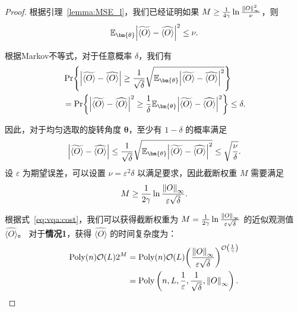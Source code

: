 \begin{proof}

  根据引理~\ref{lemma:MSE_l}，我们已经证明如果 $M\geq\frac{1}{4\gamma}\ln{\frac{\norm{O}_\infty^2}{\nu}}$，则
 \begin{equation}
  \mathbb{E}_{\bm{\theta}}\abs{\widetilde{\langle O\rangle}-\widehat{\langle O\rangle}}^2 \leq \nu.
 \end{equation}
  
 根据Markov不等式，对于任意概率 $\delta$，我们有
 \begin{equation}
    \begin{aligned}
        &\Pr{\abs{\widetilde{\langle O\rangle}-\widehat{\langle O\rangle}}\geq\frac{1}{\sqrt{\delta}}\sqrt{\mathbb{E}_{\bm{\theta}}\abs{\widetilde{\langle O\rangle}-\widehat{\langle O\rangle}}^2}}\\
        &=\Pr{\abs{\widetilde{\langle O\rangle}-\widehat{\langle O\rangle}}^2\geq\frac{1}{\delta}{\mathbb{E}_{\bm{\theta}}\abs{\widetilde{\langle O\rangle}-\widehat{\langle O\rangle}}^2}}\leq \delta.
    \end{aligned}
 \end{equation}

因此，对于均匀选取的旋转角度 $\bm{\theta}$，至少有 $1-\delta$ 的概率满足
\begin{equation}
  \abs{\widetilde{\langle O\rangle}-\widehat{\langle O\rangle}} \leq \frac{1}{\sqrt{\delta}}\sqrt{\mathbb{E}_{\bm{\theta}}\abs{\widetilde{\langle O\rangle}-\widehat{\langle O\rangle}}^2}\leq \sqrt{\frac{\nu}{\delta}}.
\end{equation}
设 $\varepsilon$ 为期望误差，可以设置 $\nu=\varepsilon^2 \delta$ 以满足要求，因此截断权重 $M$ 需要满足
\begin{equation}
  M\geq \frac{1}{2\gamma} \ln{\frac{\norm{O}_\infty}{\varepsilon \sqrt{\delta}}}.
\end{equation}

根据式~\ref{eq:vqa:cost}，我们可以获得截断权重为 $M=\frac{1}{2\gamma} \ln{\frac{\norm{O}_\infty}{\varepsilon \sqrt{\delta}}}$ 的近似观测值 $\widehat{\langle O\rangle}$。
对于\textbf{情况1}，获得 $\widehat{\langle O\rangle}$ 的时间复杂度为：
\begin{equation}
\begin{aligned}
\mathrm{Poly}(n) \order{L} 2^{M}
&=\mathrm{Poly}(n) \order{L} \bigg(\frac{\norm{O}_\infty}{\varepsilon \sqrt{\delta}} \bigg)^{\order{\frac{1}{\gamma}}}\\
&=\mathrm{Poly}\left(n,L,\frac{1}{\varepsilon},\frac{1}{\sqrt{\delta}},\norm{O}_{\infty}\right).
\end{aligned}
\end{equation}


\end{proof}

